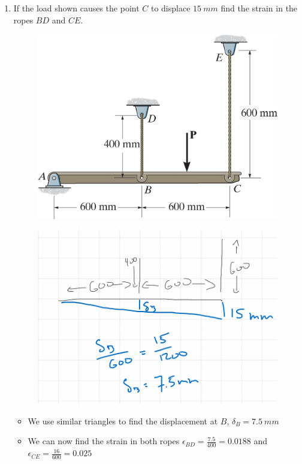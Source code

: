 \documentclass[12pt, oneside]{article}
\begin{document}
\begin{enumerate}
	\item %
		If the load shown causes the point $C$ to displace $\SI{15}{mm}$ find the strain in the ropes $BD$ and $CE$.
		\begin{figure}[H]
			\centering
			\includegraphics[width=0.5\linewidth]{tension1}
			\label{fig:tension1}
		\end{figure}
		\begin{figure}[H]
			\centering
			\includegraphics[width=0.5\linewidth]{hw2-1}
		\end{figure}
		\begin{itemize}
			\item We use similar triangles to find the displacement at $B$, $\delta_B = 	\SI{7.5}{mm}$
			\item We can now find the strain in both ropes $\epsilon_{BD} = \frac{7.5}{400} = 0.0188$ and $\epsilon_{CE} = \frac{16}{600} = 0.025$
		\end{itemize}


\end{enumerate}
\end{document}
